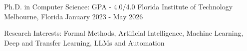 


\begin{cventries}

\cventry
{Ph.D. in Computer Science: GPA - 4.0/4.0}
{Florida Institute of Technology}
{Melbourne, Florida}
{January 2023 - May 2026}
{
\begin{cvitems}
\item {Research Interests: Formal Methods, Artificial Intelligence, Machine Learning, Deep and Transfer Learning, LLMs and Automation}

\end{cvitems}}
\end{cventries}

